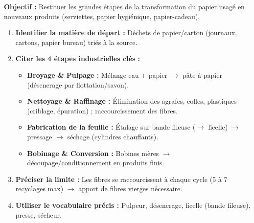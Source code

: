 \documentclass[11pt]{article}
\newcommand{\cle}[1]{{\popxbold\color{popdark}#1}}
\begin{document}
\begin{methode}
\textbf{Objectif :} Restituer les grandes étapes de la transformation du papier usagé en nouveaux produits (serviettes, papier hygiénique, papier-cadeau).
\begin{enumerate}
    \item \textbf{Identifier la matière de départ :} Déchets de papier/carton (journaux, cartons, papier bureau) triés à la source.
    \item \textbf{Citer les 4 étapes industrielles clés :}
    \begin{itemize}
        \item \textbf{Broyage \& Pulpage :} Mélange eau + papier $\rightarrow$ pâte à papier (désencrage par flottation/savon).
        \item \textbf{Nettoyage \& Raffinage :} Élimination des agrafes, colles, plastiques (criblage, épuration) ; raccourcissement des fibres.
        \item \textbf{Fabrication de la feuille :} Étalage sur bande fileuse ($\rightarrow$ \cle{ficelle}) $\rightarrow$ pressage $\rightarrow$ séchage (cylindres chauffants).
        \item \textbf{Bobinage \& Conversion :} Bobines mères $\rightarrow$ découpage/conditionnement en produits finis.
    \end{itemize}
    \item \textbf{Préciser la limite :} Les fibres se raccourcissent à chaque cycle (5 à 7 recyclages max) $\rightarrow$ apport de \cle{fibres vierges} nécessaire.
    \item \textbf{Utiliser le vocabulaire précis :} \cle{Pulpeur}, \cle{désencrage}, \cle{ficelle} (bande fileuse), \cle{presse}, \cle{sécheur}.
\end{enumerate}
\end{methode}
\end{document}
